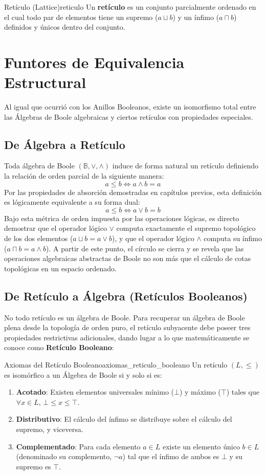 \begin{definicion}{Retículo (Lattice)}{reticulo}
Un \textbf{retículo} es un conjunto parcialmente ordenado en el cual todo par de elementos tiene un supremo ($a \sqcup b$) y un ínfimo ($a \sqcap b$) definidos y únicos dentro del conjunto.
\end{definicion}

\section{Funtores de Equivalencia Estructural}

Al igual que ocurrió con los Anillos Booleanos, existe un isomorfismo total entre las Álgebras de Boole algebraicas y ciertos retículos con propiedades especiales.

\subsection{De Álgebra a Retículo}
Toda álgebra de Boole $(\mathbb{B}, \vee, \wedge)$ induce de forma natural un retículo definiendo la relación de orden parcial de la siguiente manera:
\[ a \le b \iff a \wedge b = a \]
Por las propiedades de absorción demostradas en capítulos previos, esta definición es lógicamente equivalente a su forma dual:
\[ a \le b \iff a \vee b = b \]
Bajo esta métrica de orden impuesta por las operaciones lógicas, es directo demostrar que el operador lógico $\vee$ computa exactamente el supremo topológico de los dos elementos ($a \sqcup b = a \vee b$), y que el operador lógico $\wedge$ computa su ínfimo ($a \sqcap b = a \wedge b$). A partir de este punto, el círculo se cierra y se revela que las operaciones algebraicas abstractas de Boole no son más que el cálculo de cotas topológicas en un espacio ordenado.

\subsection{De Retículo a Álgebra (Retículos Booleanos)}
No todo retículo es un álgebra de Boole. Para recuperar un álgebra de Boole plena desde la topología de orden puro, el retículo subyacente debe poseer tres propiedades restrictivas adicionales, dando lugar a lo que matemáticamente se conoce como \textbf{Retículo Booleano}:

\begin{teorema}{Axiomas del Retículo Booleano}{axiomas_reticulo_booleano}
Un retículo $(L, \le)$ es isomórfico a un Álgebra de Boole si y solo si es:
\begin{enumerate}
    \item \textbf{Acotado}: Existen elementos universales mínimo ($\bot$) y máximo ($\top$) tales que $\forall x \in L$, $\bot \le x \le \top$.
    \item \textbf{Distributivo}: El cálculo del ínfimo se distribuye sobre el cálculo del supremo, y viceversa.
    \item \textbf{Complementado}: Para cada elemento $a \in L$ existe un elemento único $b \in L$ (denominado su complemento, $\neg a$) tal que el ínfimo de ambos es $\bot$ y su supremo es $\top$.
\end{enumerate}
\end{teorema}

